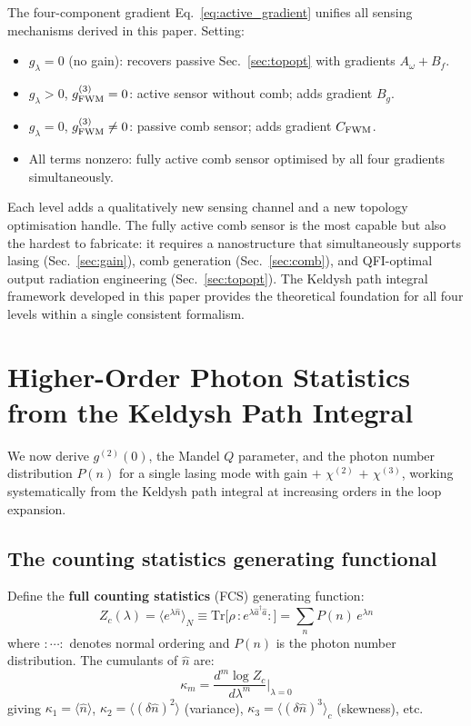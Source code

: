 \documentclass[12pt]{article}
\begin{document}
The four-component gradient
Eq.~\eqref{eq:active_gradient} unifies all sensing mechanisms derived
in this paper.  Setting:
\begin{itemize}
  \item $g_\lambda = 0$ (no gain): recovers passive Sec.~\ref{sec:topopt}
    with gradients $A_\omega + B_f$.
  \item $g_\lambda > 0$, $g^{(3)}_{\rm FWM} = 0$: active sensor without
    comb; adds gradient $B_g$.
  \item $g_\lambda = 0$, $g^{(3)}_{\rm FWM} \neq 0$: passive comb sensor;
    adds gradient $C_{\rm FWM}$.
  \item All terms nonzero: fully active comb sensor optimised by all four
    gradients simultaneously.
\end{itemize}
Each level adds a qualitatively new sensing channel and a new topology
optimisation handle.  The fully active comb sensor is the most capable
but also the hardest to fabricate: it requires a nanostructure that
simultaneously supports lasing (Sec.~\ref{sec:gain}), comb generation
(Sec.~\ref{sec:comb}), and QFI-optimal output radiation engineering
(Sec.~\ref{sec:topopt}).  The Keldysh path integral framework developed
in this paper provides the theoretical foundation for all four levels
within a single consistent formalism.



\section{Higher-Order Photon Statistics from the Keldysh Path Integral}
\label{sec:photon_stats}

We now derive $g^{(2)}(0)$, the Mandel $Q$ parameter, and the photon
number distribution $P(n)$ for a single lasing mode with gain $+$
$\chi^{(2)}$ $+$ $\chi^{(3)}$, working systematically from the
Keldysh path integral at increasing orders in the loop expansion.

\subsection{The counting statistics generating functional}
\label{sec:FCS}

Define the \textbf{full counting statistics} (FCS) generating function:
\begin{equation}
  Z_c(\lambda) = \bigl\langle e^{\lambda\hat{n}}\bigr\rangle_N
  \equiv \mathrm{Tr}\bigl[\rho\,{:}e^{\lambda\hat{a}^\dagger\hat{a}}{:}\bigr]
  = \sum_n P(n)\,e^{\lambda n}
  \label{eq:FCS_def}
\end{equation}
where ${:}\cdots{:}$ denotes normal ordering and $P(n)$ is the photon
number distribution.  The cumulants of $\hat{n}$ are:
\begin{equation}
  \kappa_m = \frac{d^m\log Z_c}{d\lambda^m}\bigg|_{\lambda=0}
  \label{eq:cumulants}
\end{equation}
giving $\kappa_1=\langle\hat{n}\rangle$,
$\kappa_2=\langle(\delta\hat{n})^2\rangle$ (variance),
$\kappa_3=\langle(\delta\hat{n})^3\rangle_c$ (skewness), etc.
\end{document}
